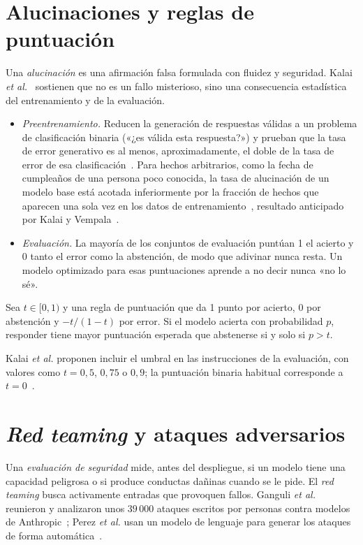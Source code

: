 \section{Alucinaciones y reglas de puntuación}

Una \emph{alucinación} es una afirmación falsa formulada con fluidez y seguridad. Kalai \emph{et al.}~\cite{kalai25} sostienen que no es un fallo misterioso, sino una consecuencia estadística del entrenamiento y de la evaluación.
\begin{itemize}[leftmargin=1.4em]
  \item \emph{Preentrenamiento.} Reducen la generación de respuestas válidas a un problema de clasificación binaria («¿es válida esta respuesta?») y prueban que la tasa de error generativo es al menos, aproximadamente, el doble de la tasa de error de esa clasificación~\cite[§3.1, corolario~1]{kalai25}. Para hechos arbitrarios, como la fecha de cumpleaños de una persona poco conocida, la tasa de alucinación de un modelo base está acotada inferiormente por la fracción de hechos que aparecen una sola vez en los datos de entrenamiento~\cite[§3.3.1, teorema~2]{kalai25}, resultado anticipado por Kalai y Vempala~\cite{kalai-vempala}.
  \item \emph{Evaluación.} La mayoría de los conjuntos de evaluación puntúan 1 el acierto y 0 tanto el error como la abstención, de modo que adivinar nunca resta. Un modelo optimizado para esas puntuaciones aprende a no decir nunca «no lo sé».
\end{itemize}

\begin{proposicion}\label{prop:umbral-t}
Sea $t\in[0,1)$ y una regla de puntuación que da 1 punto por acierto, 0 por abstención y $-t/(1-t)$ por error. Si el modelo acierta con probabilidad $p$, responder tiene mayor puntuación esperada que abstenerse si y solo si $p>t$.
\end{proposicion}

Kalai \emph{et al.} proponen incluir el umbral en las instrucciones de la evaluación, con valores como $t=0{,}5$, $0{,}75$ o $0{,}9$; la puntuación binaria habitual corresponde a $t=0$~\cite[§4.2]{kalai25}.

\section{\emph{Red teaming} y ataques adversarios}

Una \emph{evaluación de seguridad} mide, antes del despliegue, si un modelo tiene una capacidad peligrosa o si produce conductas dañinas cuando se le pide. El \emph{red teaming} busca activamente entradas que provoquen fallos. Ganguli \emph{et al.} reunieron y analizaron unos $39\,000$ ataques escritos por personas contra modelos de Anthropic~\cite{ganguli}; Perez \emph{et al.} usan un modelo de lenguaje para generar los ataques de forma automática~\cite{perez}.

